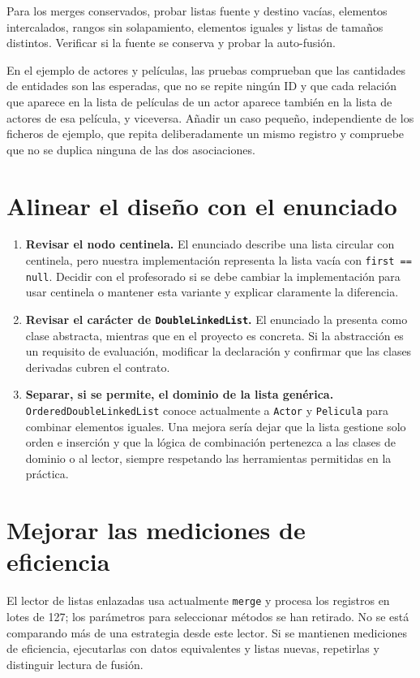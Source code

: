 \documentclass[a4paper,11pt]{report}
\begin{document}
Para los merges conservados, probar listas fuente y destino vacías, elementos intercalados, rangos sin solapamiento, elementos iguales y listas de tamaños distintos. Verificar si la fuente se conserva y probar la auto-fusión.

En el ejemplo de actores y películas, las pruebas comprueban que las cantidades de entidades son las esperadas, que no se repite ningún ID y que cada relación que aparece en la lista de películas de un actor aparece también en la lista de actores de esa película, y viceversa. Añadir un caso pequeño, independiente de los ficheros de ejemplo, que repita deliberadamente un mismo registro y compruebe que no se duplica ninguna de las dos asociaciones.

\section{Alinear el diseño con el enunciado}

\begin{enumerate}
    \item \textbf{Revisar el nodo centinela.} El enunciado describe una lista circular con centinela, pero nuestra implementación representa la lista vacía con \texttt{first == null}. Decidir con el profesorado si se debe cambiar la implementación para usar centinela o mantener esta variante y explicar claramente la diferencia.
    \item \textbf{Revisar el carácter de \texttt{DoubleLinkedList}.} El enunciado la presenta como clase abstracta, mientras que en el proyecto es concreta. Si la abstracción es un requisito de evaluación, modificar la declaración y confirmar que las clases derivadas cubren el contrato.
    \item \textbf{Separar, si se permite, el dominio de la lista genérica.} \texttt{OrderedDoubleLinkedList} conoce actualmente a \texttt{Actor} y \texttt{Pelicula} para combinar elementos iguales. Una mejora sería dejar que la lista gestione solo orden e inserción y que la lógica de combinación pertenezca a las clases de dominio o al lector, siempre respetando las herramientas permitidas en la práctica.
\end{enumerate}

\section{Mejorar las mediciones de eficiencia}

El lector de listas enlazadas usa actualmente \texttt{merge} y procesa los registros en lotes de 127; los parámetros para seleccionar métodos se han retirado. No se está comparando más de una estrategia desde este lector. Si se mantienen mediciones de eficiencia, ejecutarlas con datos equivalentes y listas nuevas, repetirlas y distinguir lectura de fusión.
\end{document}
